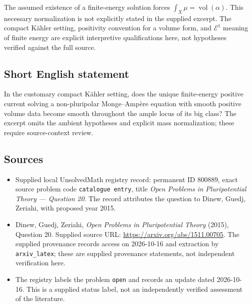 \documentclass[11pt]{article}
\begin{document}
The assumed existence of a finite-energy solution forces \(\int_X\mu=\operatorname{vol}(\alpha)\). This necessary normalization is not explicitly stated in the supplied excerpt. The compact K\"ahler setting, positivity convention for a volume form, and \(\mathcal E^1\) meaning of finite energy are explicit interpretive qualifications here, not hypotheses verified against the full source.
\subsection{Short English statement}
In the customary compact K\"ahler setting, does the unique finite-energy positive current solving a non-pluripolar Monge--Amp\`ere equation with smooth positive volume data become smooth throughout the ample locus of its big class? The excerpt omits the ambient hypotheses and explicit mass normalization; these require source-context review.
\subsection{Sources}
\begin{itemize}
\item Supplied local UnsolvedMath registry record: permanent ID \(800889\), exact source problem code \texttt{catalogue entry}, title \emph{Open Problems in Pluripotential Theory --- Question 20}. The record attributes the question to Dinew, Guedj, Zeriahi, with proposed year 2015.
\item Dinew, Guedj, Zeriahi, \emph{Open Problems in Pluripotential Theory} (2015), Question 20. Supplied source URL: \url{https://arxiv.org/abs/1511.00705}. The supplied provenance records access on 2026-10-16 and extraction by \texttt{arxiv\_latex}; these are supplied provenance statements, not independent verification here.
\item The registry labels the problem \texttt{open} and records an update dated 2026-10-16. This is a supplied status label, not an independently verified assessment of the literature.
\end{itemize}
\end{document}
